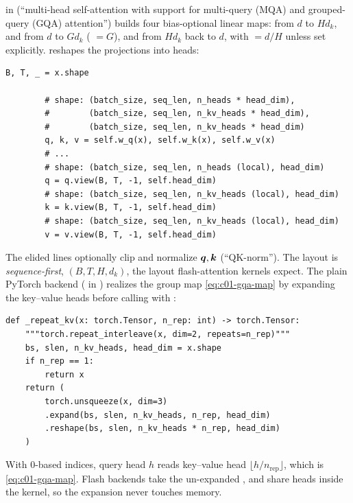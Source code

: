 \begin{implnote}[title={In the code: GQA in OLMo-core's \texttt{Attention}}]
 in 
(``multi-head self-attention with support for multi-query (MQA) and grouped-query (GQA)
attention'') builds four bias-optional linear maps:  from $d$ to $Hd_k$,
 and  from $d$ to $Gd_k$ ( $= G$), and  from
$Hd_k$ back to $d$, with  $= d/H$ unless set explicitly. 
reshapes the projections into heads:
\begin{lstlisting}[caption={Excerpt from \texttt{repos/\allowbreak allenai\_\_OLMo-core/\allowbreak src/\allowbreak olmo\_core/\allowbreak nn/\allowbreak attention/\allowbreak \_\_init\_\_.py}},label={lst:c01-olmo-qkv}]
        B, T, _ = x.shape

        # shape: (batch_size, seq_len, n_heads * head_dim),
        #        (batch_size, seq_len, n_kv_heads * head_dim),
        #        (batch_size, seq_len, n_kv_heads * head_dim)
        q, k, v = self.w_q(x), self.w_k(x), self.w_v(x)
        # ...
        # shape: (batch_size, seq_len, n_heads (local), head_dim)
        q = q.view(B, T, -1, self.head_dim)
        # shape: (batch_size, seq_len, n_kv_heads (local), head_dim)
        k = k.view(B, T, -1, self.head_dim)
        # shape: (batch_size, seq_len, n_kv_heads (local), head_dim)
        v = v.view(B, T, -1, self.head_dim)
\end{lstlisting}
The elided lines optionally clip and normalize $\bm{q}, \bm{k}$ (``QK-norm''). The layout is
\emph{sequence-first}, $(B, T, H, d_k)$, the layout flash-attention kernels expect. The
plain PyTorch backend ( in
) realizes the
group map \eqref{eq:c01-gqa-map} by expanding the key--value heads before calling
 with :
\begin{lstlisting}[caption={Excerpt from \texttt{repos/\allowbreak allenai\_\_OLMo-core/\allowbreak src/\allowbreak olmo\_core/\allowbreak nn/\allowbreak attention/\allowbreak backend.py}},label={lst:c01-olmo-repeat}]
def _repeat_kv(x: torch.Tensor, n_rep: int) -> torch.Tensor:
    """torch.repeat_interleave(x, dim=2, repeats=n_rep)"""
    bs, slen, n_kv_heads, head_dim = x.shape
    if n_rep == 1:
        return x
    return (
        torch.unsqueeze(x, dim=3)
        .expand(bs, slen, n_kv_heads, n_rep, head_dim)
        .reshape(bs, slen, n_kv_heads * n_rep, head_dim)
    )
\end{lstlisting}
With 0-based indices, query head $h$ reads key--value head $\lfloor h/n_{\mathrm{rep}}\rfloor$,
which is \eqref{eq:c01-gqa-map}. Flash backends take the un-expanded ,  and
share heads inside the kernel, so the expansion never touches memory.
\end{implnote}

